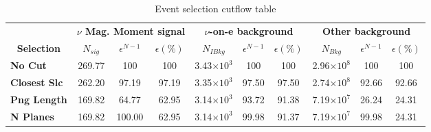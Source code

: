 \begin{table}[!hb]
\caption{Event selection cutflow table}
\begin{tabular}{|l|ccc|ccc|ccc|}\hline
\multicolumn{1}{|c|}{}                                     & \multicolumn{3}{c|}{\textbf{$\nu$ Mag. Moment signal}}          & \multicolumn{3}{c|}{\textbf{$\nu$-on-e background}}                      & \multicolumn{3}{c|}{\textbf{Other background}}                           \\
\multicolumn{1}{|c|}{\multirow{-2}{*}{\textbf{Selection}}} & \multicolumn{1}{c}{\textbf{$N_{sig}$}} & \textbf{$\epsilon^{N-1}$} & \textbf{$\epsilon \left(\%\right)$} & \multicolumn{1}{c}{\textbf{$N_{IBkg}$}} & \textbf{$\epsilon^{N-1}$} & \textbf{$\epsilon \left(\%\right)$} & \multicolumn{1}{c}{\textbf{$N_{Bkg}$}} & \textbf{$\epsilon^{N-1}$} & \textbf{$\epsilon \left(\%\right)$} \\\hline
\textbf{No Cut}      & 269.77            & 100 & 100 & 3.43$\times 10^3$           & 100 & 100                                     & 2.96$\times 10^8$          & 100                                                             & 100                                    \\
\textbf{Closest Slc} & 262.20            & 97.19                                                              & 97.19                                     & 3.35$\times 10^3$           & 97.50                                                               & 97.50                                      & 2.74$\times 10^8$          & 92.66                                                              & 92.66                                     \\
\textbf{Png Length} & 169.82            & 64.77                                                              & 62.95                                     & 3.14$\times 10^3$           & 93.72                                                               & 91.38                                      & 7.19$\times 10^7$          & 26.24                                                              & 24.31                                     \\
\textbf{N Planes}       & 169.82            & 100.00                                                             & 62.95                                     & 3.14$\times 10^3$           & 99.98                                                               & 91.37                                      & 7.19$\times 10^7$          & 99.98                                                              & 24.31                                     \\

\end{tabular}
\end{table}
